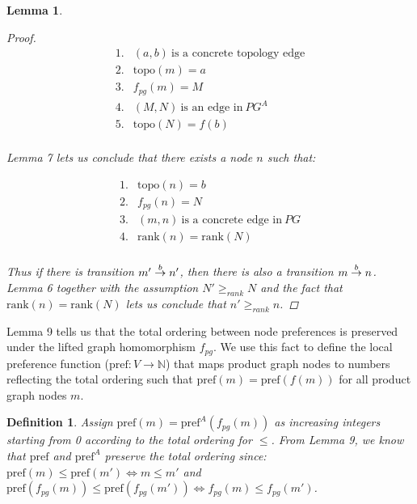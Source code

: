 \documentclass[twocolumn, openany]{sig-alternate-10pt}
\newcommand{\Pref}{\ensuremath{\mathrm{pref}}}
\newcommand{\Topo}{\ensuremath{\mathrm{topo}}}
\newcommand{\Rank}{\ensuremath{\mathrm{rank}}}
\newtheorem{defn}{Definition}
\newtheorem{lem}[thm]{Lemma}
\begin{document}
\begin{lem}
\begin{proof}
    \[ \begin{array}{ll}
      1. & (a,b) ~\text{is a concrete topology edge} \\
      2. & \Topo(m) = a \\
      3. & f_{pg}(m) = M \\
      4. & (M,N) ~\text{is an edge in}~ PG^A \\
      5. & \Topo(N) = f(b) \\
    \end{array} \]

    \noindent
    Lemma 7 lets us conclude that there exists a node $n$ such that:

    \[ \begin{array}{ll}
      1. & \Topo(n) = b \\
      2. & f_{pg}(n) = N \\
      3. & (m,n) ~\text{is a concrete edge in}~ PG \\
      4. & \Rank(n) = \Rank(N) \\
    \end{array} \] 

    \noindent
    Thus if there is transition $\trans{m'}{n'}{b}$, then there is also a transition $\trans{m}{n}{b}$. 
    Lemma 6 together with the assumption $N' \geq_{rank} N$ and the fact that $\Rank(n) = \Rank(N)$ lets us conclude that $n' \geq_{rank} n$.

  \end{proof}

\end{lem}


\vspace{1em}
Lemma 9 tells us that the total ordering between node preferences is preserved under the lifted graph homomorphism $f_{pg}$. 
We use this fact to define the local preference function ($\Pref : V \rightarrow \mathbb{N}$) that maps product graph nodes to numbers reflecting the total ordering such that $\Pref(m) = \Pref(f(m))$ for all product graph nodes $m$.

\vspace{1em}
\begin{defn}
  Assign $\Pref(m) = \Pref^A(f_{pg}(m))$ as increasing integers starting from 0 according to the total ordering for $\leq$.
  From Lemma 9, we know that $\Pref$ and $\Pref^A$ preserve the total ordering since: $\Pref(m) \leq \Pref(m') \iff m \leq m'$ and $\Pref(f_{pg}(m)) \leq \Pref(f_{pg}(m')) \iff f_{pg}(m) \leq f_{pg}(m')$.
\end{defn}
\end{document}
